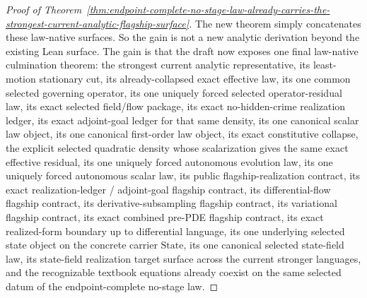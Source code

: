 \begin{proof}[Proof of Theorem~\ref{thm:endpoint-complete-no-stage-law-already-carries-the-strongest-current-analytic-flagship-surface}]
The new theorem simply concatenates these law-native surfaces. So the gain is
not a new analytic derivation beyond the existing Lean surface. The gain is
that the draft now exposes one final law-native culmination theorem: the
strongest current analytic representative, its least-motion stationary cut,
its already-collapsed exact effective law, its one common selected governing
operator, its one uniquely forced selected operator-residual law, its exact
selected field/flow package, its exact no-hidden-crime realization ledger, its
exact adjoint-goal ledger for that same density, its one canonical scalar law
object, its one canonical first-order law object, its exact constitutive
collapse, the explicit selected quadratic density whose scalarization gives
the same exact effective residual, its one uniquely forced autonomous
evolution law, its one uniquely forced autonomous scalar law, its public
flagship-realization contract, its exact realization-ledger / adjoint-goal
flagship contract, its differential-flow flagship contract, its
derivative-subsampling flagship contract, its variational flagship contract,
its exact combined pre-PDE flagship contract, its exact realized-form boundary
up to differential language, its one underlying selected state object on the
concrete carrier \(\mathrm{State}\), its one canonical selected state-field
law, its state-field realization target surface across the current stronger
languages, and the recognizable textbook equations already coexist on the same
selected datum of the endpoint-complete no-stage law.
\end{proof}

